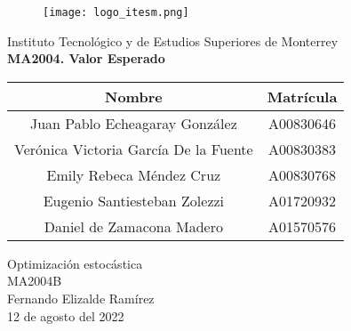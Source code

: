 \documentclass{article}
\begin{document}
    \begin{titlepage}
        \begin{center}
            \begin{figure}
                \centering
                \texttt{[image: logo\_itesm.png]}\\ %
            \end{figure}
        \vspace{5cm}
        \LARGE{Instituto Tecnológico y de Estudios Superiores de Monterrey}\\
        \fontsize{12}{14}\selectfont
        \vspace{1cm}
        \textbf{MA2004. Valor Esperado}\\ %
        \vspace{0.7cm}
        \begin{table}[h!]
            \centering
            \begin{tabular}{ ||c|c|| }
                \hline
                Nombre & Matrícula \\
                \hline
                Juan Pablo Echeagaray González & A00830646 \\
                \hline
                Verónica Victoria García De la Fuente & A00830383 \\
                \hline
                Emily Rebeca Méndez Cruz & A00830768 \\
                \hline
                Eugenio Santiesteban Zolezzi & A01720932 \\
                \hline
                Daniel de Zamacona Madero & A01570576 \\
                \hline
            \end{tabular}
        \end{table}
        \vspace{0.7cm}
        Optimización estocástica\\ %
        \vspace{0.2cm}
        MA2004B\\ %
        \vspace{0.2cm}
        Fernando Elizalde Ramírez\\ %
        \vspace{0.7cm}
        12 de agosto del 2022\\ %
        \end{center}
    \end{titlepage}
\end{document}
